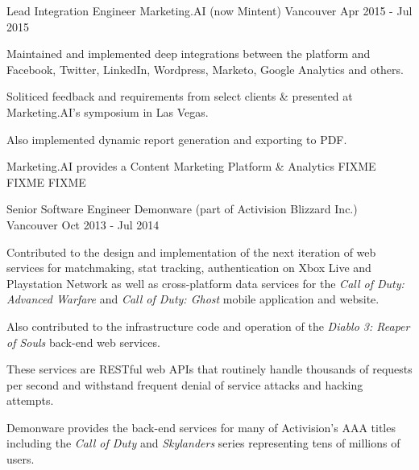 \begin{cventries}
  \cventrywithsummary
    {Lead Integration Engineer} %
    {Marketing.AI (now Mintent)} %
    {Vancouver} %
    {Apr 2015 - Jul 2015} %
    {
      \begin{cvitems} %
        \item {Maintained and implemented deep integrations between the platform and Facebook, Twitter, LinkedIn, Wordpress, Marketo, Google Analytics and others.}
        \item {Soliticed feedback and requirements from select clients \& presented at Marketing.AI's symposium in Las Vegas.}
        \item {Also implemented dynamic report generation and exporting to PDF.}
      \end{cvitems}
    }
    {
      Marketing.AI provides a Content Marketing Platform \& Analytics FIXME FIXME FIXME
    }

  \cventrywithsummary
    {Senior Software Engineer} %
    {Demonware (part of Activision Blizzard Inc.)} %
    {Vancouver} %
    {Oct 2013 - Jul 2014} %
    {
      \begin{cvitems} %
        \item {Contributed to the design and implementation of the next iteration of web services for matchmaking, stat tracking, authentication on Xbox Live and Playstation Network as well as cross-platform data services for the \textit{Call of Duty: Advanced Warfare} and \textit{Call of Duty: Ghost} mobile application and website.}
        \item {Also contributed to the infrastructure code and operation of the \textit{Diablo 3: Reaper of Souls} back-end web services.}
        \item {These services are RESTful web APIs that routinely handle thousands of requests per second and withstand frequent denial of service attacks and hacking attempts.}
      \end{cvitems}
    }
    {
      Demonware provides the back-end services for many of Activision's AAA titles including the \textit{Call of Duty} and \textit{Skylanders} series representing tens of millions of users.
    }


\end{cventries}
